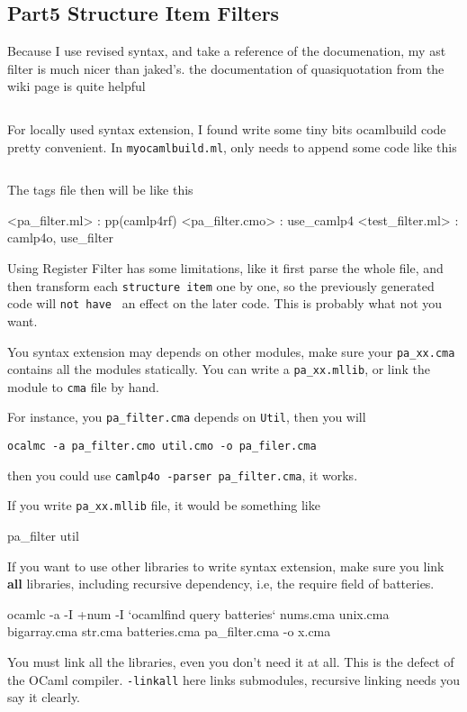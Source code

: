 \subsection{Part5 Structure Item Filters}
Because I use revised syntax, and take a reference of the
documenation, my ast filter is much nicer than jaked's.  the
documentation of quasiquotation from the wiki page is quite helpful

\inputminted{ocaml}{camlp4/code/jake/pa_filter.ml}

For locally used syntax extension, I found write some tiny bits
ocamlbuild code pretty convenient. In \verb|myocamlbuild.ml|, only
needs to append some code like this

\inputminted[firstline=101,lastline=112]{ocaml}{camlp4/code/jake/myocamlbuild.ml}

The tags file then will be like this 
\begin{bluetext}
<pa_filter.{ml}> : pp(camlp4rf)
<pa_filter.{cmo}> : use_camlp4
<test_filter.ml> : camlp4o, use_filter
\end{bluetext}

Using Register Filter has some limitations, like it first parse the
whole file, and then transform each \verb|structure item| one by one,
so the previously generated code will \verb|not have | an effect on
the later code. This is probably what not you want.


You syntax extension may depends on other modules, make sure your
\verb|pa_xx.cma| contains all the modules statically. You can write a
\verb|pa_xx.mllib|, or link the module to \verb|cma| file by hand.

For instance, you \verb|pa_filter.cma| depends on \verb|Util|, then
you will 

\verb|ocalmc -a pa_filter.cmo util.cmo -o pa_filer.cma|

then you could use \verb|camlp4o -parser pa_filter.cma|, it works.

If you write \verb|pa_xx.mllib| file, it would be something like

\begin{bluetext}
pa_filter
util
\end{bluetext}
If you want to use other libraries to write syntax extension, make
sure you link \textbf{all} libraries, including recursive dependency,
i.e, the require field of batteries.
\begin{bluetext}
ocamlc -a  -I +num -I `ocamlfind query batteries` nums.cma unix.cma
bigarray.cma str.cma batteries.cma pa_filter.cma -o x.cma
\end{bluetext}
You must link all the libraries, even you don't need it at all. This
is the defect of the OCaml compiler.
\verb|-linkall| here links submodules, recursive linking needs you say
it clearly.

